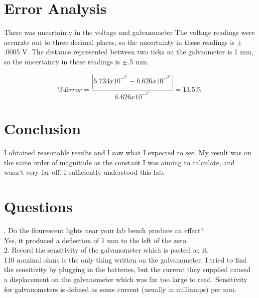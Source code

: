 \documentclass[12pt]{article}
\begin{document}
\section{Error Analysis}
\indent \indent There was uncertainty in the voltage and galvanometer The voltage readings were accurate out to three decimal places, so the uncertainty in these readings is $\pm$.0005 V. The distance represented between two ticks on the galvaometer is 1 mm, so the uncertainty in these readings is $\pm$.5 mm.

\[\% Error = \frac{|5.734 x 10^-^3^4 - 6.626 x 10^-^3^4|}{6.626 x 10^-^3^4} = 13.5 \% \]

\section{Conclusion}
\indent \indent I obtained reasonable results and I saw what I expected to see. My result was on the same order of magnitude as the constant I was aiming to calculate, and wasn't very far off. I sufficiently understood this lab.

\section{Questions}
\indent {}. Do the flourescent lights near your lab bench produce an effect? \\
Yes, it produced a deflection of 1 mm to the left of the zero. \\

2. Record the sensitivity of the galvanometer which is pasted on it. \\
110 nominal ohms is the only thing written on the galvanometer. I tried
to find the sensitivity by plugging in the batteries, but the current they
supplied caused a displacement on the galvanometer which was far too large
to read. Sensitivity for galvanometers is defined as some current (usually
in milliamps) per mm.
\end{document}
